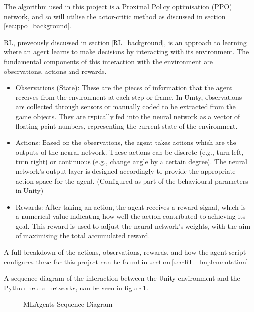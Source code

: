 The algorithm used in this project is a Proximal Policy optimisation (PPO) network, and so will utilise the actor-critic method as discussed in section$~$\ref{sec:ppo_background}.

RL, preveously discussed in section$~$\ref{RL_background}, is an approach to learning where an agent learns to make decisions by interacting with its environment. The fundamental components of this interaction with the environment are observations, actions and rewards.
\begin{itemize}
    \item Observations (State): These are the pieces of information that the agent receives from the environment at each step or frame. In Unity, observations are collected through sensors or manually coded to be extracted from the game objects. They are typically fed into the neural network as a vector of floating-point numbers, representing the current state of the environment.
    \item Actions: Based on the observations, the agent takes actions which are the outputs of the neural network. These actions can be discrete (e.g., turn left, turn right) or continuous (e.g., change angle by a certain degree). The neural network's output layer is designed accordingly to provide the appropriate action space for the agent. (Configured as part of the behavioural parameters in Unity)
    \item Rewards: After taking an action, the agent receives a reward signal, which is a numerical value indicating how well the action contributed to achieving its goal. This reward is used to adjust the neural network's weights, with the aim of maximising the total accumulated reward.
\end{itemize}
A full breakdown of the actions, observations, rewards, and how the agent script configures these for this project can be found in section$~$\ref{sec:RL_Implementation}.

A sequence diagram of the interaction between the Unity environment and the Python neural networks, can be seen in figure$~$\ref{MLAgents_Seq_Diagram}.

\begin{figure}[h]
    \centering
    \caption{MLAgents Sequence Diagram}\label{MLAgents_Seq_Diagram}
\end{figure}

